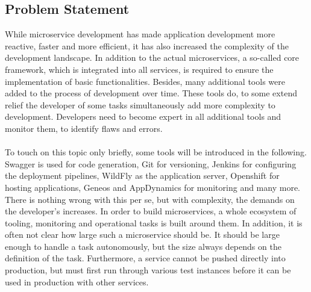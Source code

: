 \documentclass[a4paper,twoside,11pt, pagesize]{scrartcl}
\begin{document}
\begin{spacing}{1.2}
\subsection{Problem Statement}
While microservice development has made application development more reactive, faster and more efficient, it has also increased the complexity of the development landscape. In addition to the actual microservices, a so-called core framework, which is integrated into all services, is required to ensure the implementation of basic functionalities. Besides, many additional tools were added to the process of development over time. These tools do, to some extend relief the developer of some tasks simultaneously add more complexity to development. Developers need to become expert in all additional tools and monitor them, to identify flaws and errors.\\\\
To touch on this topic only briefly, some tools will be introduced in the following. Swagger is used for code generation, Git for versioning, Jenkins for configuring the deployment pipelines, WildFly as the application server, Openshift for hosting applications, Geneos and AppDynamics for monitoring and many more. There is nothing wrong with this per se, but with complexity, the demands on the developer's increases. In order to build microservices, a whole ecosystem of tooling, monitoring and operational tasks is built around them. In addition, it is often not clear how large such a microservice should be. It should be large enough to handle a task autonomously, but the size always depends on the definition of the task. Furthermore, a service cannot be pushed directly into production, but must first run through various test instances before it can be used in production with other services.\\\\

\end{spacing}
\end{document}
